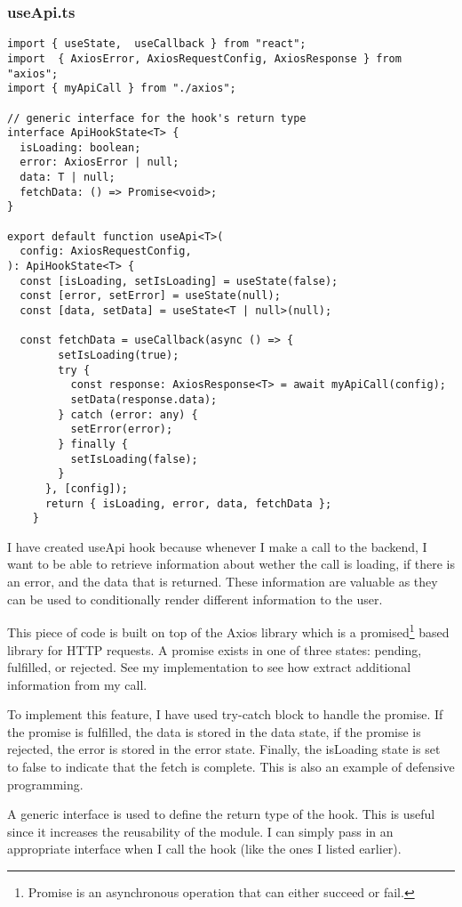\subsubsection{useApi.ts}
\begin{verbatim}
import { useState,  useCallback } from "react";
import  { AxiosError, AxiosRequestConfig, AxiosResponse } from "axios";
import { myApiCall } from "./axios";

// generic interface for the hook's return type
interface ApiHookState<T> {
  isLoading: boolean;
  error: AxiosError | null; 
  data: T | null;
  fetchData: () => Promise<void>;
}

export default function useApi<T>(
  config: AxiosRequestConfig,
): ApiHookState<T> {
  const [isLoading, setIsLoading] = useState(false);
  const [error, setError] = useState(null);
  const [data, setData] = useState<T | null>(null);

  const fetchData = useCallback(async () => {
        setIsLoading(true);
        try {
          const response: AxiosResponse<T> = await myApiCall(config);
          setData(response.data);
        } catch (error: any) {
          setError(error);
        } finally {
          setIsLoading(false);
        }
      }, [config]);
      return { isLoading, error, data, fetchData };
    }
\end{verbatim}
I have created useApi hook because whenever I make a call to the backend, I want to be able to retrieve information about wether the call is loading, if there is an error, and the data that is returned. These information are valuable as they can be used to conditionally render different information to the user. 

This piece of code is built on top of the Axios library which is a promised\footnote{Promise is an asynchronous operation that can either succeed or fail. }  based library for HTTP requests. A promise exists in one of three states: pending, fulfilled, or rejected. See my implementation to see how extract additional information from my call.

To implement this feature, I have used try-catch block to handle the promise. If the promise is fulfilled, the data is stored in the data state, if the promise is rejected, the error is stored in the error state. Finally, the isLoading state is set to false to indicate that the fetch is complete. This is also an example of defensive programming.

A generic interface is used to define the return type of the hook. This is useful since it increases the reusability of the module. I can simply pass in an appropriate interface when I call the hook (like the ones I listed earlier).

